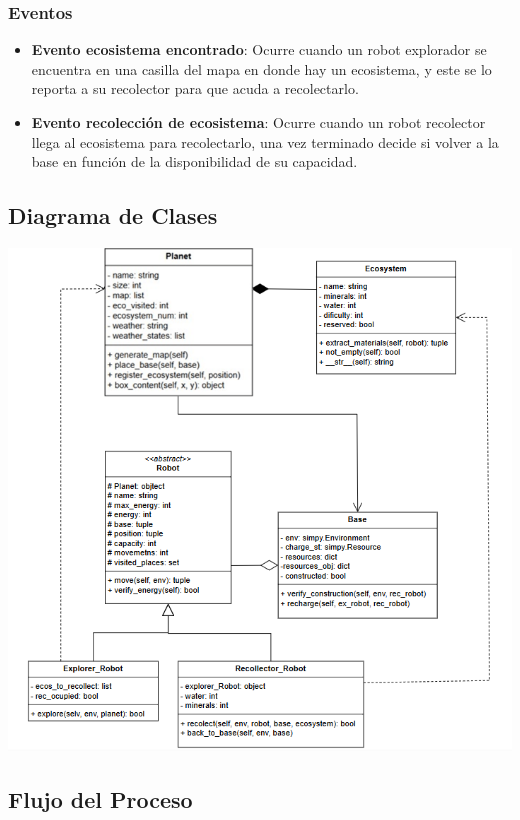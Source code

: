 \documentclass[a4paper,12pt]{article}
\begin{document}
\subsubsection{Eventos}
\begin{itemize}[label=\textbullet]
    \item \textbf{Evento ecosistema encontrado}: Ocurre cuando un robot explorador se encuentra en una casilla del mapa en donde hay un ecosistema, y este se lo reporta a su recolector para que acuda a recolectarlo.
    \item \textbf{Evento recolección de ecosistema}: Ocurre cuando un robot recolector llega al ecosistema para recolectarlo, una vez terminado decide si volver a la base en función de la disponibilidad de su capacidad.    
\end{itemize}

\subsection{Diagrama de Clases}

\includegraphics[scale=0.85]{images/diag_clases.png}


\newpage

\subsection{Flujo del Proceso}
\end{document}
